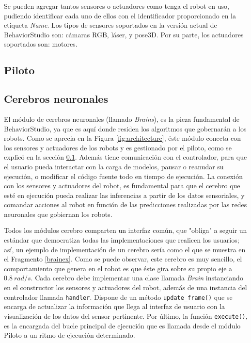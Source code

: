 Se pueden agregar tantos sensores o actuadores como tenga el robot en uso, pudiendo identificar cada uno de ellos con el identificador proporcionado en la etiqueta \textit{Name}. Los tipos de sensores soportados en la versión actual de BehaviorStudio son: cámaras RGB, láser, y pose3D. Por su parte, los actuadores soportados son: motores.

\subsection{Piloto}
\label{sec:pilot}



\subsection{Cerebros neuronales}

El módulo de cerebros neuronales (llamado \textit{Brains}), es la pieza fundamental de BehaviorStudio, ya que es aquí donde residen los algoritmos que gobernarán a los robots. Como se aprecia en la Figura \ref{fig:architecture}, éste módulo conecta con los sensores y actuadores de los robots y es gestionado por el piloto, como se explicó en la sección \ref{sec:pilot}. Además tiene comunicación con el controlador, para que el usuario pueda interactar con la carga de modelos, pausar o reanudar su ejecución, o modificar el código fuente todo en tiempo de ejecución. La conexión con los sensores y actuadores del robot, es fundamental para que el cerebro que esté en ejecución pueda realizar las inferencias a partir de los datos sensoriales, y comandar acciones al robot en función de las predicciones realizadas por las redes neuronales que gobiernan los robots.

Todos los módulos cerebro comparten un interfaz común, que "obliga" a seguir un estándar que democratiza todas las implementaciones que realicen los usuarios; así, un ejemplo de implementación de un cerebro sería como el que se muestra en el Fragmento \ref{brainex}. Como se puede observar, este cerebro es muy sencillo, el comportamiento que genera en el robot es que éste gira sobre su propio eje a $ 0.8\ rad/s $. Cada cerebro debe implementar una clase llamada \textit{Brain} instanciando en el constructor los sensores y actuadores del robot, además de una instancia del controlador llamada \lstinline{handler}. Dispone de un método \lstinline {update_frame()} que se encarga de actualizar la información que llega al interfaz de usuario con la visualización de los datos del sensor pertinente. Por último, la función \lstinline {execute()}, es la encargada del bucle principal de ejecución que es llamada desde el módulo Piloto a un ritmo de ejecución determinado.


